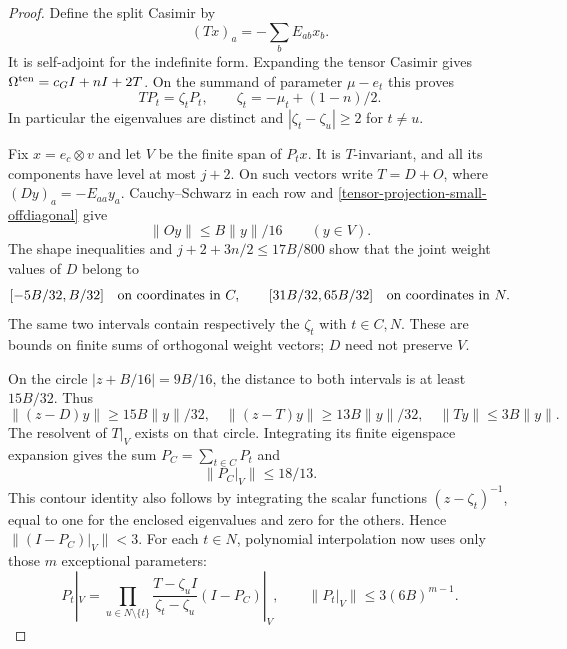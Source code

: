 \begin{proof}
Define the split Casimir by
\[
                    (Tx)_a=-\sum_b E_{ab}x_b.
\]
It is self-adjoint for the indefinite form.  Expanding the tensor
Casimir gives $\Omega^{\rm ten}=c_G I+nI+2T$.  On the summand of
parameter $\mu-e_t$ this proves
\[
                   TP_t=\zeta_tP_t,\qquad
                   \zeta_t=-\mu_t+(1-n)/2.
\]
In particular the eigenvalues are distinct and
$|\zeta_t-\zeta_u|\ge2$ for $t\ne u$.

Fix $x=e_c\otimes v$ and let $V$ be the finite span of $P_tx$.
It is $T$-invariant, and all its components have level at most $j+2$.
On such vectors write $T=D+O$, where $(Dy)_a=-E_{aa}y_a$.
Cauchy--Schwarz in each row and
\eqref{tensor-projection-small-offdiagonal} give
\begin{equation}\label{tensor-projection-perturbation}
                     \|Oy\|\le B\|y\|/16\qquad(y\in V).
\end{equation}
The shape inequalities and
$j+2+3n/2\le17B/800$ show that the joint weight values of $D$
belong to
\[
          [-5B/32,B/32]\quad\hbox{on coordinates in }C,
 \qquad [31B/32,65B/32]\quad\hbox{on coordinates in }N.
\]
The same two intervals contain respectively the $\zeta_t$ with
$t\in C,N$.  These are bounds on finite sums of orthogonal weight
vectors; $D$ need not preserve $V$.

On the circle $|z+B/16|=9B/16$, the distance to both intervals is
at least $15B/32$.  Thus
\[
 \|(z-D)y\|\ge15B\|y\|/32,\quad
 \|(z-T)y\|\ge13B\|y\|/32,\quad
                            \|Ty\|\le3B\|y\|.
\]
The resolvent of $T|_V$ exists on that circle.  Integrating its finite
eigenspace expansion gives the sum $P_C=\sum_{t\in C}P_t$ and
\begin{equation}\label{tensor-projection-cloud-bound}
                         \|P_C|_V\|\le18/13.
\end{equation}
This contour identity also follows by integrating the scalar functions
$(z-\zeta_t)^{-1}$, equal to one for the enclosed eigenvalues and zero
for the others.  Hence $\|(I-P_C)|_V\|<3$.
For each $t\in N$, polynomial interpolation now uses only those
$m$ exceptional parameters:
\[
 P_t|_V=
 \prod_{u\in N\setminus\{t\}}
          \frac{T-\zeta_u I}{\zeta_t-\zeta_u}(I-P_C)|_V,
 \qquad \|P_t|_V\|\le3(6B)^{m-1}.
\]


\end{proof}
